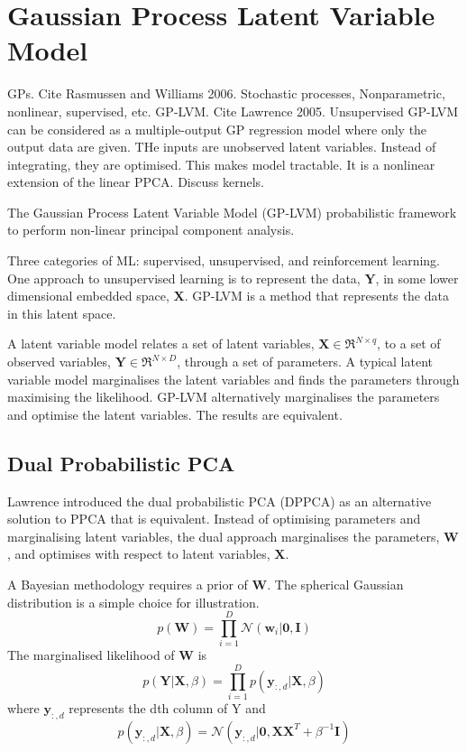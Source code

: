 \documentclass[ %
                    author={Dillon Keith Diep},
                supervisor={Dr. Carl Henrik Ek},
                    degree={MEng},
                     title={Assisted Content Generation for 3D Hair Geometry},
                  subtitle={[INCOMPLETE DRAFT, CONTAINS NOTES FROM RESEARCH]},
                      type={Research},
                      year={2014} ]{dissertation}
\begin{document}
\section{Gaussian Process Latent Variable Model}

GPs. Cite Rasmussen and Williams 2006. Stochastic processes, Nonparametric, nonlinear, supervised, etc.
GP-LVM. Cite Lawrence 2005. Unsupervised\cite{gplvm}
GP-LVM can be considered as a multiple-output GP regression model where only the output data are given.
THe inputs are unobserved latent variables.
Instead of integrating, they are optimised. This makes model tractable. It is a nonlinear extension of the linear PPCA. 
Discuss kernels.

The Gaussian Process Latent Variable Model (GP-LVM) probabilistic framework to perform non-linear principal component analysis. 

Three categories of ML: supervised, unsupervised, and reinforcement learning.
One approach to unsupervised learning is to represent the data, $\mathbf{Y}$, in some lower dimensional embedded space, $\mathbf{X}$. GP-LVM is a method that represents the data in this latent space.

A latent variable model relates a set of latent variables, $\mathbf{X}\in \Re^{N\times q}$, to a set of observed variables, $\mathbf{Y}\in \Re^{N\times D}$, through a set of parameters. A typical latent variable model marginalises the latent variables and finds the parameters through maximising the likelihood. GP-LVM alternatively marginalises the parameters and optimise the latent variables. The results are equivalent.

\subsection{Dual Probabilistic PCA}
Lawrence introduced the dual probabilistic PCA (DPPCA) as an alternative solution to PPCA that is equivalent. Instead of optimising parameters and marginalising latent variables, the dual approach marginalises the parameters, $\mathbf{W}$, and optimises with respect to latent variables, $\mathbf{X}$.

A Bayesian methodology requires a prior of $\mathbf{W}$. The spherical Gaussian distribution is a simple choice for illustration.
\begin{equation}
	p(\mathbf{W})=\prod^D_{i=1}\mathcal{N}(\mathbf{w}_i|\mathbf{0,I})
\end{equation}
The marginalised likelihood of $\mathbf{W}$ is
\begin{equation}
	p(\mathbf{Y|X},\beta)=\prod^D_{i=1}p(\mathbf{y}_{:,d}|\mathbf{X},\beta)
\end{equation}
where $\mathbf{y}_{:,d}$ represents the dth column of Y and
\begin{equation}
	p(\mathbf{y}_{:,d}|\mathbf{X},\beta)=\mathcal{N}(\mathbf{y}_{:,d}|\mathbf{0,XX}^T+\beta^{-1}\mathbf{I})
\end{equation}
\end{document}
